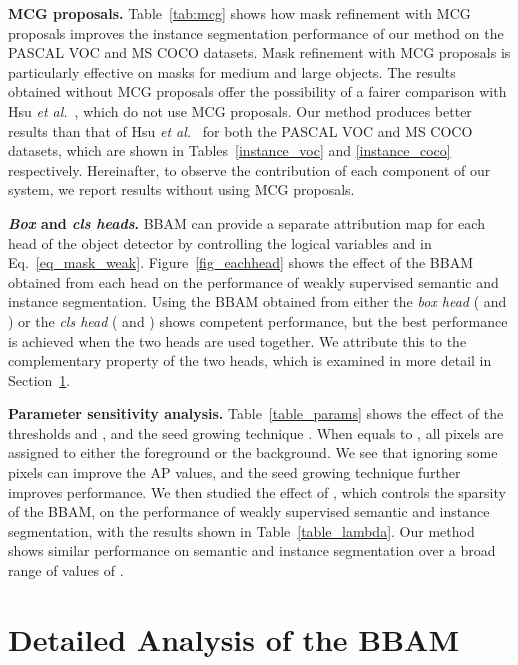\documentclass[final]{cvpr}
\begin{document}
\begin{figure*}[t]
\textbf{MCG proposals.}
Table~\ref{tab:mcg} shows how mask refinement with MCG proposals improves the instance segmentation performance of our method on the PASCAL VOC and MS COCO datasets.
Mask refinement with MCG proposals is particularly effective on masks for medium and large objects. 
The results obtained without MCG proposals offer the possibility of a fairer comparison with Hsu \textit{et al.}~\cite{hsu2019weakly}, which do not use MCG proposals. Our method produces better results than that of Hsu \textit{et al.}~\cite{hsu2019weakly} for both the PASCAL VOC and MS COCO datasets, which are shown in Tables~\ref{instance_voc} and \ref{instance_coco} respectively.
Hereinafter, to observe the contribution of each component of our system, we report results without using MCG proposals.

\textbf{\textit{Box} and \textit{cls heads}.}
BBAM can provide a separate attribution map for each head of the object detector by controlling the logical variables  and  in Eq.~\ref{eq_mask_weak}.
Figure~\ref{fig_eachhead} shows the effect of the BBAM obtained from each head on the performance of weakly supervised semantic and instance segmentation. Using the BBAM obtained from either the \textit{box head} ( and ) or the \textit{cls head} ( and ) shows competent performance, but the best performance is achieved when the two heads are used together. 
We attribute this to the complementary property of the two heads, which is examined in more detail in Section~\ref{sec_analysis}.







\textbf{Parameter sensitivity analysis.} Table~\ref{table_params} shows the effect of the thresholds  and , and the seed growing technique .
When  equals to , all pixels are assigned to either the foreground or the background.
We see that ignoring some pixels can improve the AP values, and the seed growing technique further improves performance.
We then studied the effect of , which controls the sparsity of the BBAM, on the performance of weakly supervised semantic and instance segmentation, with the results shown in Table~\ref{table_lambda}. 
Our method shows similar performance on semantic and instance segmentation over a broad range of values of .




\section{Detailed Analysis of the BBAM}\label{sec_analysis}




\end{figure*}
\end{document}
